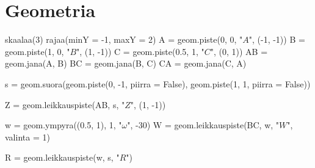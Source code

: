 \section{Geometria}
\begin{kuva}
skaalaa(3)
rajaa(minY = -1, maxY = 2)
A = geom.piste(0, 0, "$A$", (-1, -1))
B = geom.piste(1, 0, "$B$", (1, -1))
C = geom.piste(0.5, 1, "$C$", (0, 1))
AB = geom.jana(A, B)
BC = geom.jana(B, C)
CA = geom.jana(C, A)

s = geom.suora(geom.piste(0, -1, piirra = False), geom.piste(1, 1, piirra = False))

Z = geom.leikkauspiste(AB, s, "$Z$", (1, -1))

w = geom.ympyra((0.5, 1), 1, "$\omega$", -30)
W = geom.leikkauspiste(BC, w, "$W$", valinta = 1)

R = geom.leikkauspiste(w, s, "$R$")
\end{kuva}
